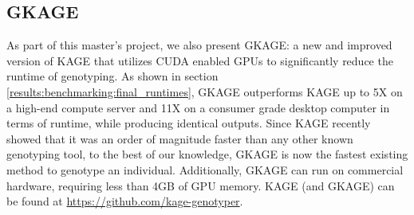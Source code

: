 \subsection{GKAGE} \label{results:gkage}




As part of this master's project, we also present GKAGE: a new and improved version of KAGE that utilizes CUDA enabled GPUs to significantly reduce the runtime of genotyping.
As shown in section \ref{results:benchmarking:final_runtimes}, GKAGE outperforms KAGE up to 5X on a high-end compute server and 11X on a consumer grade desktop computer in terms of runtime, while producing identical outputs.
Since KAGE recently showed that it was an order of magnitude faster than any other known genotyping tool, to the best of our knowledge, GKAGE is now the fastest existing method to genotype an individual.
Additionally, GKAGE can run on commercial hardware, requiring less than 4GB of GPU memory.
KAGE (and GKAGE) can be found at \url{https://github.com/kage-genotyper}.

